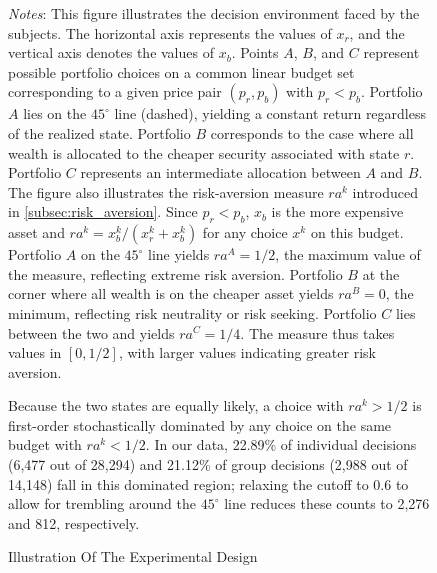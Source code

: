 \documentclass[11 pt]{article}
\begin{document}
\begin{figure}[H]
\centering
\caption{Illustration Of The Experimental Design }\label{fig:decition_problem_example}
\begin{minipage}{\textwidth}
{\footnotesize \emph{Notes}: This figure illustrates the decision environment faced by the subjects. The horizontal axis represents the values of $x_r$, and the vertical axis denotes the values of $x_b$. Points $A$, $B$, and $C$ represent possible portfolio choices on a common linear budget set corresponding to a given price pair $(p_r, p_b)$ with $p_r < p_b$. Portfolio $A$ lies on the $45^\circ$ line (dashed), yielding a constant return regardless of the realized state. Portfolio $B$ corresponds to the case where all wealth is allocated to the cheaper security associated with state $r$. Portfolio $C$ represents an intermediate allocation between $A$ and $B$. The figure also illustrates the risk-aversion measure $ra^k$ introduced in \autoref{subsec:risk_aversion}. Since $p_r < p_b$, $x_b$ is the more expensive asset and $ra^k = x_b^k / (x_r^k + x_b^k)$ for any choice $x^k$ on this budget. Portfolio $A$ on the $45^\circ$ line yields $ra^A = 1/2$, the maximum value of the measure, reflecting extreme risk aversion. Portfolio $B$ at the corner where all wealth is on the cheaper asset yields $ra^B = 0$, the minimum, reflecting risk neutrality or risk seeking. Portfolio $C$ lies between the two and yields $ra^C = 1/4$. The measure thus takes values in $[0, 1/2]$, with larger values indicating greater risk aversion.

Because the two states are equally likely, a choice with $ra^k > 1/2$ is first-order stochastically dominated by any choice on the same budget with $ra^k < 1/2$. In our data, 22.89\% of individual decisions (6,477 out of 28,294) and 21.12\% of group decisions (2,988 out of 14,148) fall in this dominated region; relaxing the cutoff to $0.6$ to allow for trembling around the $45^\circ$ line reduces these counts to 2,276 and 812, respectively.}
\end{minipage}
\end{figure}
\end{document}
